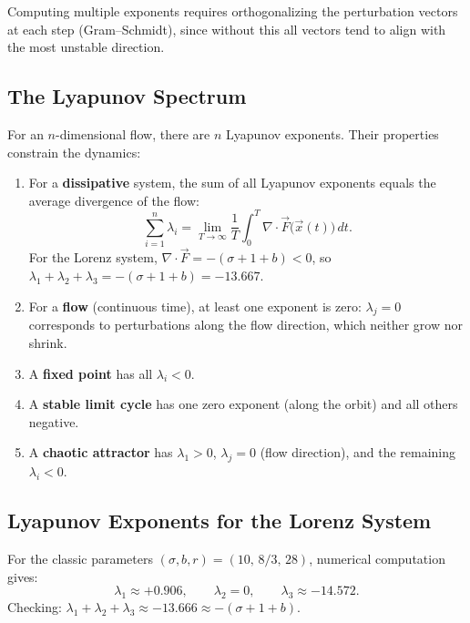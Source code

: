 \documentclass[11pt,letterpaper]{article}
\theoremstyle{definition}
\theoremstyle{plain}
\theoremstyle{remark}
\begin{document}
Computing multiple exponents requires orthogonalizing the perturbation
vectors at each step (Gram--Schmidt), since without this all vectors
tend to align with the most unstable direction.

\subsection{The Lyapunov Spectrum}

For an $n$-dimensional flow, there are $n$ Lyapunov exponents.  Their
properties constrain the dynamics:

\begin{keyresult}
\begin{enumerate}[leftmargin=2em]
\item For a \textbf{dissipative} system, the sum of all Lyapunov exponents
      equals the average divergence of the flow:
      \begin{equation}\label{eq:sum-lyap}
        \sum_{i=1}^n \lambda_i = \lim_{T\to\infty}\frac{1}{T}
        \int_0^T \nabla\cdot\vec{F}\bigl(\vec{x}(t)\bigr)\,dt.
      \end{equation}
      For the Lorenz system, $\nabla\cdot\vec{F} = -(\sigma+1+b) < 0$,
      so $\lambda_1+\lambda_2+\lambda_3 = -(\sigma+1+b) = -13.667$.

\item For a \textbf{flow} (continuous time), at least one exponent is
      zero: $\lambda_j = 0$ corresponds to perturbations along the flow
      direction, which neither grow nor shrink.

\item A \textbf{fixed point} has all $\lambda_i < 0$.

\item A \textbf{stable limit cycle} has one zero exponent (along the
      orbit) and all others negative.

\item A \textbf{chaotic attractor} has $\lambda_1 > 0$, $\lambda_j = 0$
      (flow direction), and the remaining $\lambda_i < 0$.
\end{enumerate}
\end{keyresult}

\subsection{Lyapunov Exponents for the Lorenz System}

For the classic parameters $(\sigma,b,r) = (10,\,8/3,\,28)$, numerical
computation gives:
\begin{equation}
  \lambda_1 \approx +0.906, \qquad \lambda_2 = 0, \qquad
  \lambda_3 \approx -14.572.
\end{equation}
Checking: $\lambda_1+\lambda_2+\lambda_3 \approx -13.666 \approx -(\sigma+1+b)$. \checkmark
\end{document}
